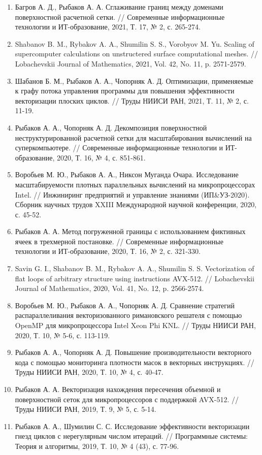 \documentclass[a4paper,14pt]{extarticle}                     %
\theoremstyle{plain}                                         %
\begin{document}
\begin{enumerate}[noitemsep,topsep=0pt,parsep=0pt,partopsep=0pt]
\item Багров А. Д., Рыбаков А. А. Сглаживание границ между доменами поверхностной расчетной сетки. // Современные информационные технологии и ИТ-образование, 2021, Т. 17, № 2, с. 265-274.
\item Shabanov B. M., Rybakov A. A., Shumilin S. S., Vorobyov M. Yu. Scaling of supercomputer calculations on unstructered surface computational meshes. // Lobachevskii Journal of Mathematics, 2021, Vol. 42, No. 11, p. 2571-2579.
\item Шабанов Б. М., Рыбаков А. А., Чопорняк А. Д. Оптимизации, применяемые к графу потока управления программы для повышения эффективности векторизации плоских циклов. // Труды НИИСИ РАН, 2021, Т. 11, № 2, с. 11-19.
\item Рыбаков А. А., Чопорняк А. Д. Декомпозиция поверхностной неструктурированной расчетной сетки для масштабирования вычислений на суперкомпьютере. // Современные информационные технологии и ИТ-образование, 2020, Т. 16, № 4, с. 851-861.
\item Воробьев М. Ю., Рыбаков А. А., Никсон Муганда Очара. Исследование масштабируемости плотных параллельных вычислений на микропроцессорах Intel. // Инжиниринг предприятий и управление знаниями (ИП\&УЗ-2020). Сборник научных трудов XXIII Международной научной конференции, 2020, с. 45-52.
\item Рыбаков А. А. Метод погруженной границы с использованием фиктивных ячеек в трехмерной постановке. // Современные информационные технологии и ИТ-образование, 2020, Т. 16, № 2, с. 321-330.
\item Savin G. I., Shabanov B. M., Rybakov A. A., Shumilin S. S. Vectorization of flat loops of arbitrary structure using instructions AVX-512. // Lobachevskii Journal of Mathematics, 2020, Vol. 41, No. 12, p. 2566-2574.
\item Воробьев М. Ю., Рыбаков А. А., Чопорняк А. Д. Сравнение стратегий распараллеливания векторизованного римановского решателя с помощью OpenMP для микропроцессора Intel Xeon Phi KNL. // Труды НИИСИ РАН, 2020, Т. 10, № 5-6, с. 113-119.
\item Рыбаков А. А., Чопорняк А. Д. Повышение производительности векторного кода с помощью мониторинга плотности масок в векторных инструкциях. // Труды НИИСИ РАН, 2020, Т. 10, № 4, с. 40-47.
\item Рыбаков А. А. Векторизация нахождения пересечения объемной и поверхностной сеток для микропроцессоров с поддержкой AVX-512. // Труды НИИСИ РАН, 2019, Т. 9, № 5, с. 5-14.
\item Рыбаков А. А., Шумилин С. С. Исследование эффективности векторизации гнезд циклов с нерегулярным числом итераций. // Программные системы: Теория и алгоритмы, 2019, Т. 10, № 4 (43), с. 77-96.

\end{enumerate}
\end{document}
